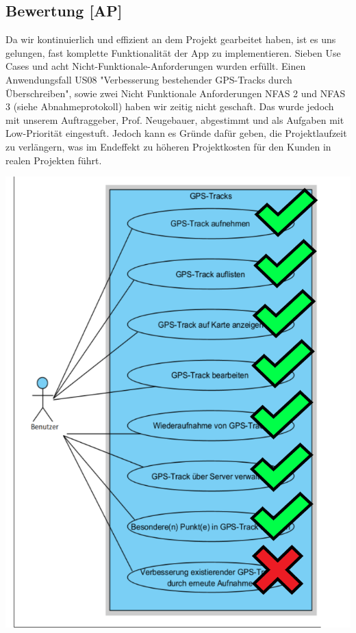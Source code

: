 \documentclass[10pt]{article}
\begin{document}
\subsection{Bewertung [AP]}
    Da wir kontinuierlich und effizient an dem Projekt gearbeitet haben, ist es uns gelungen, fast komplette Funktionalität der App zu implementieren.
    Sieben Use Cases und  acht Nicht-Funktionale-Anforderungen wurden erfüllt. Einen Anwendungsfall US08 "Verbesserung bestehender GPS-Tracks durch Überschreiben", sowie  
    zwei Nicht Funktionale Anforderungen NFAS 2 und NFAS 3 (siehe Abnahmeprotokoll) haben wir zeitig nicht geschaft. Das wurde jedoch mit unserem Auftraggeber, Prof. Neugebauer, 
    abgestimmt und als Aufgaben mit Low-Priorität eingestuft.
    Jedoch kann es Gründe dafür geben, die Projektlaufzeit zu verlängern, was im Endeffekt zu höheren Projektkosten für den Kunden in realen Projekten führt.
    \begin{center}
        \includegraphics[scale=0.4]{use_case_comleted.png}
    \end{center}
\end{document}
